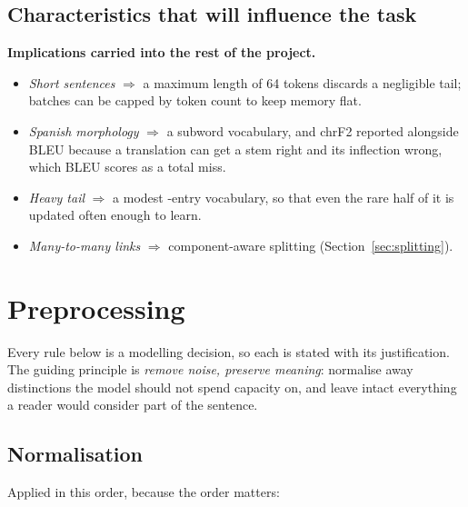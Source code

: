 \documentclass[11pt,a4paper]{article}
\begin{document}

\subsection{Characteristics that will influence the task}

\begin{decisionbox}
\textbf{Implications carried into the rest of the project.}
\begin{itemize}
  \item \emph{Short sentences} $\Rightarrow$ a maximum length of 64 tokens
    discards a negligible tail; batches can be capped by token count to keep
    memory flat.
  \item \emph{Spanish morphology} $\Rightarrow$ a subword vocabulary, and
    chrF2 reported alongside BLEU because a translation can get a stem right
    and its inflection wrong, which BLEU scores as a total miss.
  \item \emph{Heavy tail} $\Rightarrow$ a modest \SubwordVocab-entry
    vocabulary, so that even the rare half of it is updated often enough to
    learn.
  \item \emph{Many-to-many links} $\Rightarrow$ component-aware splitting
    (Section~\ref{sec:splitting}).
\end{itemize}
\end{decisionbox}

\section{Preprocessing}
\label{sec:preprocessing}

Every rule below is a modelling decision, so each is stated with its
justification. The guiding principle is \emph{remove noise, preserve meaning}:
normalise away distinctions the model should not spend capacity on, and leave
intact everything a reader would consider part of the sentence.

\subsection{Normalisation}

Applied in this order, because the order matters:
\end{document}
